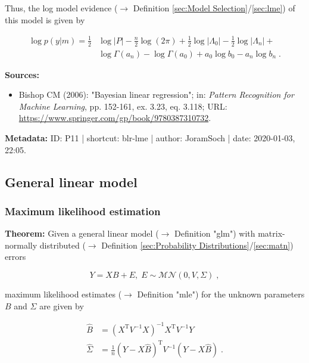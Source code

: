 \documentclass[a4paper,12pt]{book}
\begin{document}
Thus, the log model evidence ($\rightarrow$ Definition \ref{sec:Model Selection}/\ref{sec:lme}) of this model is given by

\begin{equation} \label{eq:blr-lme-GLM-NG-LME-s6}
\begin{split}
\log p(y|m) = \frac{1}{2} & \log |P| - \frac{n}{2} \log (2 \pi)  + \frac{1}{2} \log |\Lambda_0| - \frac{1}{2} \log |\Lambda_n| + \\
& \log \Gamma(a_n) - \log \Gamma(a_0) + a_0 \log b_0 - a_n \log b_n \; .
\end{split}
\end{equation}

\vspace{1em}
\textbf{Sources:}
\begin{itemize}
\item Bishop CM (2006): "Bayesian linear regression"; in: \textit{Pattern Recognition for Machine Learning}, pp. 152-161, ex. 3.23, eq. 3.118; URL: \url{https://www.springer.com/gp/book/9780387310732}.
\end{itemize}


\vspace{1em}
\textbf{Metadata:} ID: P11 | shortcut: blr-lme | author: JoramSoch | date: 2020-01-03, 22:05.


\subsection{General linear model}

\subsubsection[\textbf{Maximum likelihood estimation}]{Maximum likelihood estimation} \label{sec:glm-mle}

\vspace{1em}
\textbf{Theorem:} Given a general linear model ($\rightarrow$ Definition "glm") with matrix-normally distributed ($\rightarrow$ Definition \ref{sec:Probability Distributions}/\ref{sec:matn}) errors

\begin{equation} \label{eq:glm-mle-GLM}
Y = X B + E, \; E \sim \mathcal{MN}(0, V, \Sigma) \; ,
\end{equation}

maximum likelihood estimates ($\rightarrow$ Definition "mle") for the unknown parameters $B$ and $\Sigma$ are given by

\begin{equation} \label{eq:glm-mle-GLM-MLE}
\begin{split}
\hat{B} &= (X^\mathrm{T} V^{-1} X)^{-1} X^\mathrm{T} V^{-1} Y \\
\hat{\Sigma} &= \frac{1}{n} (Y - X\hat{B})^\mathrm{T} V^{-1} (Y - X\hat{B}) \; . \\
\end{split}
\end{equation}
\end{document}
